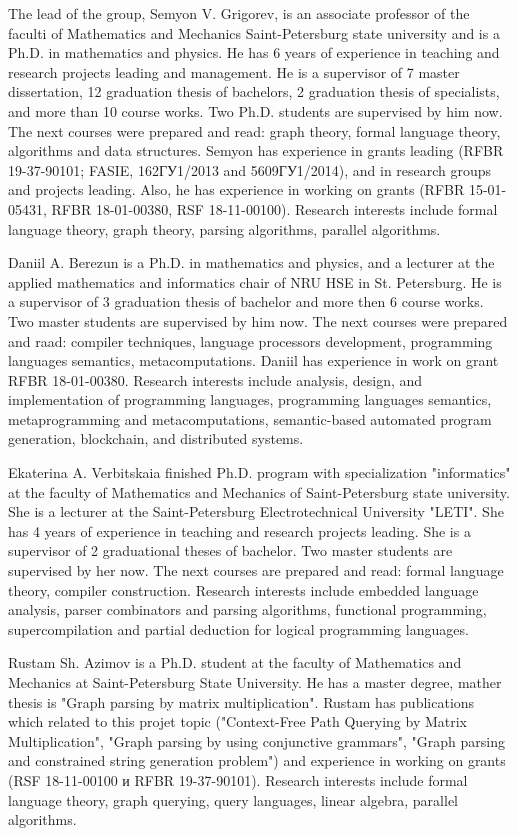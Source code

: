 \documentclass[12pt]{article}  %
\theoremstyle{remark}
\begin{document}
The lead of the group, Semyon V. Grigorev, is an associate professor of the faculti of Mathematics and Mechanics Saint-Petersburg state university and is a Ph.D. in mathematics and physics. He has 6 years of experience in teaching and research projects leading and management. He is a supervisor of 7 master dissertation, 12 graduation thesis of bachelors, 2 graduation thesis of specialists, and more than 10 course works. Two Ph.D. students are supervised by him now. The next courses were prepared and read: graph theory, formal language theory, algorithms and data structures.
Semyon has experience in grants leading (RFBR 19-37-90101; FASIE, 162ГУ1/2013 and 5609ГУ1/2014), and in research groups and projects leading. Also, he has experience in working on grants (RFBR 15-01-05431, RFBR 18-01-00380, RSF 18-11-00100). Research interests include formal language theory, graph theory, parsing algorithms, parallel algorithms.

Daniil A. Berezun is a Ph.D. in mathematics and physics, and a lecturer at the applied mathematics and informatics chair of NRU HSE in St. Petersburg. He is a supervisor of 3 graduation thesis of bachelor and more then 6 course works. Two master students are supervised by him now.
The next courses were prepared and raad: compiler techniques, language processors development, programming languages semantics, metacomputations.
Daniil has experience in work on grant RFBR 18-01-00380. Research interests include analysis, design, and implementation of programming languages, programming languages semantics, metaprogramming and metacomputations, semantic-based automated program generation, blockchain, and distributed systems.

Ekaterina A. Verbitskaia finished Ph.D. program with specialization "informatics" at the faculty of Mathematics and Mechanics of Saint-Petersburg state university. She is a lecturer at the Saint-Petersburg Electrotechnical University "LETI".
She has 4 years of experience in teaching and research projects leading. She is a supervisor of 2 graduational theses of bachelor. Two master students are supervised by her now. The next courses are prepared and read: formal language theory, compiler construction. Research interests include embedded language analysis, parser combinators and parsing algorithms, functional programming, supercompilation and partial deduction for logical programming languages.

Rustam Sh. Azimov is a Ph.D. student at the faculty of Mathematics and Mechanics at Saint-Petersburg State University. He has a master degree, mather thesis is "Graph parsing by matrix multiplication". Rustam has publications which related to this projet topic ("Context-Free Path Querying by Matrix Multiplication", "Graph parsing by using conjunctive grammars", "Graph parsing and constrained string generation problem") and experience in working on grants (RSF 18-11-00100 и RFBR 19-37-90101).
Research interests include formal language theory, graph querying, query languages, linear algebra, parallel algorithms.
\end{document}

